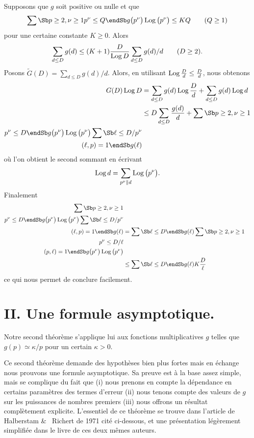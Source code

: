 Supposons que $g$ soit positive ou nulle et que
$$
\sum\Sb p\ge 2,\nu\ge1 \\ p^{\nu}\le Q\endSb
g\big(p^{\nu}\big)\Log\big(p^{\nu}\big)
\le KQ\qquad(Q\ge1)
$$
pour une certaine constante $K\ge0$. Alors
$$
\sum_{d\le D}g(d)\le (K+1)\frac{D}{\Log D}\sum_{d\le D}g(d)/d
\qquad(D\ge2).
$$
\endproclaim
{}
Posons $\tilde G(D)=\sum_{d\le D} g(d)/d$. Alors,
en utilisant $\Log\frac Dd\le\frac Dd$, nous obtenons
$$
\aligned
G(D)\Log D
&=\sum_{d\le D}g(d)\Log\frac{D}{d}+
\sum_{d\le D}g(d)\Log d
\\&\le
D \sum_{d\le D}\frac{g(d)}{d}
+\sum\Sb p\ge 2,\nu\ge1 \\ p^{\nu}\le D\endSb
g\big(p^{\nu}\big)\Log\big(p^{\nu}\big)
\sum\Sb \ell\le D/p^{\nu}\\ (\ell,p)=1\endSb g(\ell)
\endaligned
$$
o\`u l'on obtient le second sommant en \'ecrivant
$$
\Log d=\sum_{p^{\nu}\|d}\Log\big(p^{\nu}\big).
$$
Finalement
$$
\aligned
\sum\Sb p\ge 2,\nu\ge1 \\ p^{\nu}\le D\endSb
g\big(p^{\nu}\big)\Log\big(p^{\nu}\big)
\sum\Sb \ell\le D/p^{\nu}\\ (\ell,p)=1\endSb g(\ell)
&=
\sum\Sb \ell\le D\endSb g(\ell)
\sum\Sb p\ge 2,\nu\ge1 \\ p^{\nu}\le D/\ell\\ (p,\ell)=1\endSb
g\big(p^{\nu}\big)\Log\big(p^{\nu}\big)
\\&\le
\sum\Sb \ell\le D\endSb g(\ell)K\frac{D}\ell
\endaligned
$$
ce qui nous permet de conclure facilement.
\fin

\section{II. Une formule asymptotique.}

Notre second th\'eor\`eme s'applique lui aux fonctions
multiplicatives $g$ telles que $g(p)\simeq\kappa/p$ pour un certain
$\kappa>0$.

Ce second th\'eor\`eme demande des hypoth\`eses bien plus fortes
mais en \'echange nous prouvons une formule asymptotique.
Sa preuve est \`a la base assez simple, mais se complique
du fait que (i) nous prenons en compte la d\'ependance en certains
param\`etres des termes d'erreur (ii) nous tenons compte des valeurs
de $g$ sur les puissances de nombres premiers (iii) nous offrons  un
r\'esultat compl\`etement explicite. L'essentiel de ce th\'eor\`eme se
trouve dans l'article de Halberstam \&~ Richert de 1971 cit\'e ci-dessous, et
une pr\'esentation l\'eg\`erement simplifi\'ee dans le livre de ces
deux m\^emes auteurs.

